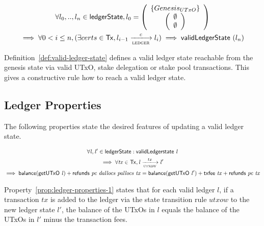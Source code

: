 \begin{definition}
  \begin{multline*}
    \label{eq:2}
    \forall l_{0},..,l_{n} \in \ledgerState, l_{0} =
    \left(
      \begin{array}{c}
        \left\{
        \genesisUTxO
        \right\} \\
        \left(
        \begin{array}{c}
          \emptyset\\
          \emptyset
        \end{array}
        \right)
      \end{array}
    \right)  \\
    \implies \forall 0 < i \leq n, (\exists certs \in \Tx, l_{i-1}
    \trans{ledger}{c} l_{i}) \implies \applyFun{validLedgerState}(l_{n})
  \end{multline*}
  \label{def:valid-ledger-state}
\end{definition}

Definition~\ref{def:valid-ledger-state} defines a valid ledger state reachable
from the genesis state via valid UTxO, stake delegation or stake pool
transactions. This gives a constructive rule how to reach a valid ledger state.

\subsection{Ledger Properties}
\label{sec:ledger-properties}

The following properties state the desired features of updating a valid ledger
state.

\begin{property}
  \begin{multline*}
    \forall \var{l}, \var{l'} \in \ledgerState: \applyFun{validLedgerstate}{l}\\
    \implies \forall \var{tx} \in \Tx, \var{l} \trans{utxow}{tx} \var{l'} \\
    \implies \fun{balance}(\applyFun{getUTxO}{l}) +
    \fun{refunds}~\var{pc}~\var{dallocs}~\var{pallocs}~\var{tx} =
    \fun{balance}(\applyFun{getUTxO}{l'}) + \applyFun{txfee}{tx} +
    \fun{refunds}~\var{pc}~\var{tx}
  \end{multline*}
  \label{prop:ledger-properties-1}
\end{property}

Property~\ref{prop:ledger-properties-1} states that for each valid ledger $l$,
if a transaction $tx$ is added to the ledger via the state transition rule
$utxow$ to the new ledger state $l'$, the balance of the UTxOs in $l$ equals the
balance of the UTxOs in $l'$ minus the transaction fees.

